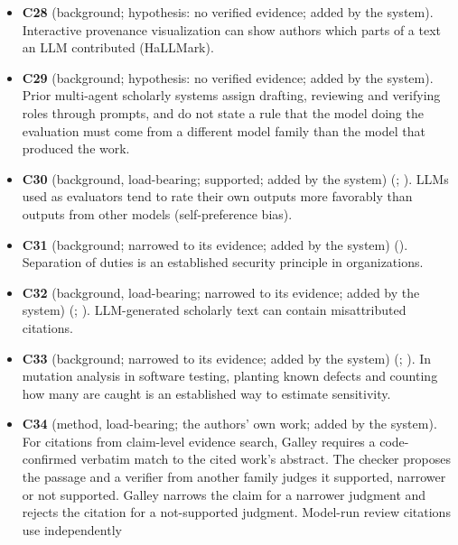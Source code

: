 \documentclass[
]{article}
\begin{document}
\begin{itemize}
  systems already automate parts of scholarly production: writing
  scientific surveys (DeepSurvey) and checking that citations support
  the claims they are attached to.
\item
  \textbf{C28} (background; hypothesis: no verified evidence; added by
  the system). Interactive provenance visualization can show authors
  which parts of a text an LLM contributed (HaLLMark).
\item
  \textbf{C29} (background; hypothesis: no verified evidence; added by
  the system). Prior multi-agent scholarly systems assign drafting,
  reviewing and verifying roles through prompts, and do not state a rule
  that the model doing the evaluation must come from a different model
  family than the model that produced the work.
\item
  \textbf{C30} (background, load-bearing; supported; added by the
  system) (;
  ). LLMs used as
  evaluators tend to rate their own outputs more favorably than outputs
  from other models (self-preference bias).
\item
  \textbf{C31} (background; narrowed to its evidence; added by the
  system) (). Separation of duties is an established security principle in
  organizations.
\item
  \textbf{C32} (background, load-bearing; narrowed to its evidence;
  added by the system) (; ).
  LLM-generated scholarly text can contain misattributed citations.
\item
  \textbf{C33} (background; narrowed to its evidence; added by the
  system) (;
  ). In mutation
  analysis in software testing, planting known defects and counting how
  many are caught is an established way to estimate sensitivity.
\item
  \textbf{C34} (method, load-bearing; the authors' own work; added by
  the system). For citations from claim-level evidence search, Galley
  requires a code-confirmed verbatim match to the cited work's abstract.
  The checker proposes the passage and a verifier from another family
  judges it supported, narrower or not supported. Galley narrows the
  claim for a narrower judgment and rejects the citation for a
  not-supported judgment. Model-run review citations use independently

\end{itemize}
\end{document}
